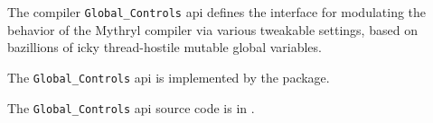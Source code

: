 
The compiler {\tt Global\_Controls} api defines the interface for modulating the 
behavior of the Mythryl compiler via various tweakable settings, based on 
bazillions of icky thread-hostile mutable global variables. 

The {\tt Global\_Controls} api is implemented by the  package.

The {\tt Global\_Controls} api source code is in .





